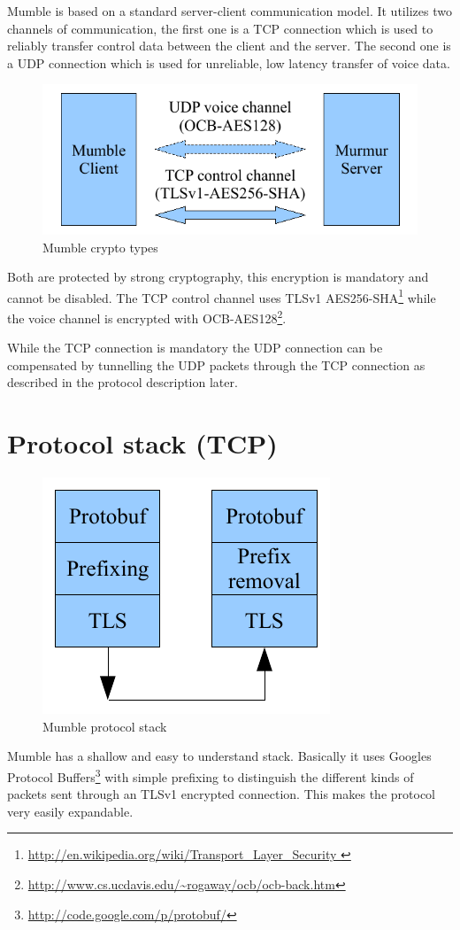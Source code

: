 \documentclass[11pt]{article} %
\begin{document}
Mumble is based on a standard server-client communication model. It utilizes two channels of communication, the first one is a TCP connection which is used to reliably transfer control data between the client and the server. The second one is a UDP connection which is used for unreliable, low latency transfer of voice data.

\begin{figure}[ht]
	\centering
	\includegraphics[width=0.5\linewidth]{resources/mumble_crypt_types}
	\caption{Mumble crypto types}
	\label{fig:mumble_crypt_types}
\end{figure}

Both are protected by strong cryptography, this encryption is mandatory and cannot be disabled. The TCP control channel uses TLSv1 AES256-SHA\footnote{\url{http://en.wikipedia.org/wiki/Transport_Layer_Security }} while the voice channel is encrypted with OCB-AES128\footnote{\url{http://www.cs.ucdavis.edu/~rogaway/ocb/ocb-back.htm}}.

While the TCP connection is mandatory the UDP connection can be compensated by tunnelling the UDP packets through the TCP connection as described in the protocol description later.

\section{Protocol stack (TCP)}

\begin{figure}[ht]
	\centering
	\includegraphics[width=0.3\linewidth]{resources/mumble_protocol_stack}
	\caption{Mumble protocol stack}
	\label{fig:mumble_protocol_stack}
\end{figure}

Mumble has a shallow and easy to understand stack. Basically it uses Googles Protocol Buffers\footnote{\url{http://code.google.com/p/protobuf/}} with simple prefixing to distinguish the different kinds of packets sent through an TLSv1 encrypted connection. This makes the protocol very easily expandable.
\end{document}

